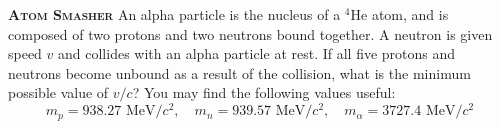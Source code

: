 \begin{problem}{\textbf{\textsc{Atom Smasher}}}
An alpha particle is the nucleus of a $^4\text{He}$ atom, and is composed of two protons and two neutrons bound together. A neutron is given speed $v$ and collides with an alpha particle at rest. If all five protons and neutrons become unbound as a result of the collision, what is the minimum possible value of $v/c$? You may find the following values useful:
$$m_p = 938.27\text{ MeV}/c^2,\quad m_n = 939.57\text{ MeV}/c^2,\quad m_{\alpha} = 3727.4\text{ MeV}/c^2$$
\end{problem}